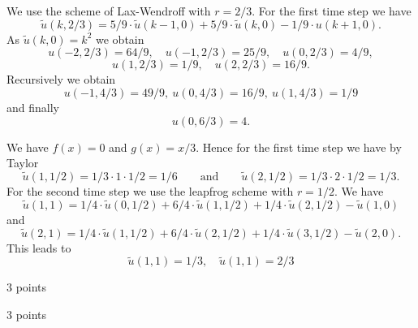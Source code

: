\begin{loesung}
\begin{teilaufgaben}
\item
%
We use the scheme of Lax-Wendroff with $r = 2/3$.
For the first time step we have
\[
\tilde u(k,2/3)
=
5/9 \cdot \tilde u(k-1, 0)
+
5/9 \cdot \tilde u(k, 0)
-
1/9 \cdot u(k+1,0).
\tag{\bf 1P}
\]
As $\tilde u(k, 0) =  k^2$ we obtain
\[
u(-2,2/3) = 64/9, \quad u(-1,2/3) = 25/9, \quad u(0,2/3) = 4/9,
\]
\[
u(1,2/3) = 1/9, \quad u(2,2/3) = 16/9.
\tag{\bf 1P}
\]
Recursively we obtain
\[
u(-1,4/3) = 49/9, \ u(0,4/3) = 16/9, \ u(1,4/3) = 1/9
\]
and finally
\[
u(0,6/3) = 4.
\tag{\bf 1P}
\]
%
%
%
\item
We have $f(x) = 0$ and $g(x) = x/3$.
Hence for the first time step we have by Taylor
\[
\tilde u(1, 1/2)
=
1/3 \cdot 1 \cdot 1/2 = 1/6
\qquad\text{and}\qquad
\tilde u(2, 1/2) = 1/3 \cdot 2 \cdot 1/2 = 1/3.
\tag{\bf 1P}
\]
For the second time step we use the leapfrog scheme with $r = 1/2$.
We have
\[ 
\tilde u(1, 1)
=
1/4 \cdot \tilde u(0, 1/2)
+
6/4 \cdot \tilde u(1,1/2)
+
1/4 \cdot  \tilde u(2, 1/2)
-
\tilde u(1,0)
\]
and
\[
\tilde u(2, 1)
=
1/4 \cdot \tilde u(1, 1/2)
+
6/4 \cdot \tilde u(2,1/2)
+
1/4 \cdot \tilde u(3, 1/2)
-
\tilde u(2,0).
\tag{\bf 1P}
\]
This leads to
\[
\tilde u(1, 1) = 1/3, \quad \tilde u(1, 1) = 2/3
\tag{\bf 1P}
\]
\end{teilaufgaben}
\end{loesung}

\begin{bewertung}
\begin{teilaufgaben}
\item 3 points
\item 3 points
\end{teilaufgaben}
\end{bewertung}
